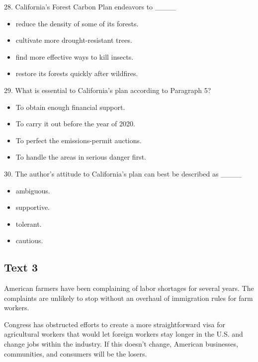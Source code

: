 \documentclass[UTF8,11pt]{ctexart}
\begin{document}
28. California's Forest Carbon Plan endeavors to \_\_\_\_


\begin{itemize}[leftmargin=2em,itemsep=.2em,topsep=.4em]\item[A.] reduce the density of some of its forests.
\item[B.] cultivate more drought-resistant trees.
\item[C.] find more effective ways to kill insects.
\item[D.] restore its forests quickly after wildfires.
\end{itemize}

29. What is essential to California's plan according to Paragraph 5?


\begin{itemize}[leftmargin=2em,itemsep=.2em,topsep=.4em]\item[A.] To obtain enough financial support.
\item[B.] To carry it out before the year of 2020.
\item[C.] To perfect the emissions-permit auctions.
\item[D.] To handle the areas in serious danger first.
\end{itemize}

30. The author's attitude to California's plan can best be described as \_\_\_\_


\begin{itemize}[leftmargin=2em,itemsep=.2em,topsep=.4em]\item[A.] ambiguous.
\item[B.] supportive.
\item[C.] tolerant.
\item[D.] cautious.
\end{itemize}

\subsection*{\textbf{Text 3}}


American farmers have been complaining of labor shortages for several years. The complaints are unlikely to stop without an overhaul of immigration rules for farm workers.


Congress has obstructed efforts to create a more straightforward visa for agricultural workers that would let foreign workers stay longer in the U.S. and change jobs within the industry. If this doesn't change, American businesses, communities, and consumers will be the losers.
\end{document}
